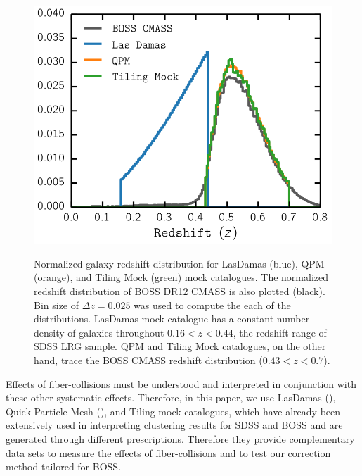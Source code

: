 \documentclass{emulateapj}
\begin{document}
\def \cmasscolor{black}
\def \ldgcolor{blue}
\def \qpmcolor{orange}
\def \tmcolor{green}
\begin{figure}
\begin{center}
\includegraphics[scale=0.45]{fcpaper_z_dist.png} \label{fig:zdist}
\caption{Normalized galaxy redshift distribution for LasDamas (\ldgcolor), QPM (\qpmcolor), and Tiling Mock (\tmcolor) mock catalogues. The normalized redshift distribution of BOSS DR12 CMASS is also plotted (\cmasscolor). Bin size of $\Delta z = 0.025$ was used to compute the each of the distributions. LasDamas mock catalogue has a constant number density of galaxies throughout $0.16 < z < 0.44$, the redshift range of SDSS LRG sample. QPM and Tiling Mock catalogues, on the other hand, trace the BOSS CMASS redshift distribution ($0.43 < z < 0.7$).}
\end{center}
\end{figure}

Effects of fiber-collisions must be understood and interpreted in conjunction with these other systematic effects. Therefore, in this paper, we use LasDamas (\citealt{McBride:2009aa, McBride:2011aa}), Quick Particle Mesh (\citealt{White:2014aa}), and Tiling mock catalogues, which have already been extensively used in interpreting clustering results for SDSS and BOSS and are generated through different prescriptions. Therefore they provide complementary data sets to measure the effects of fiber-collisions and to test our correction method tailored for BOSS. 
\end{document}
